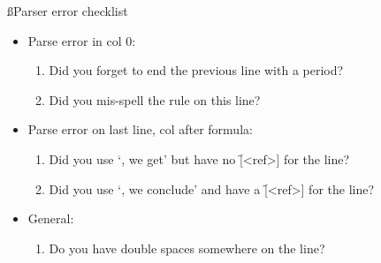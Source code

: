 \documentclass[manual.tex]{subfiles}
\begin{document}
\ss{Parser error checklist}
\begin{itemize}
\item Parse error in col 0:
    \begin{enumerate}[{\bf ?}]
      \item Did you forget to end the previous line with a period?
      \item Did you mis-spell the rule on this line?
    \end{enumerate}
\item Parse error on last line, col after formula:
    \begin{enumerate}[{\bf ?}]
      \item Did you use `, we get' but have no \f{[<ref>]} for the line?
      \item Did you use `, we conclude' and have a \f{[<ref>]} for the line?
    \end{enumerate}
\item General:
    \begin{enumerate}[{\bf ?}]
      \item Do you have double spaces somewhere on the line?
    \end{enumerate}
\end{itemize}
\end{document}
